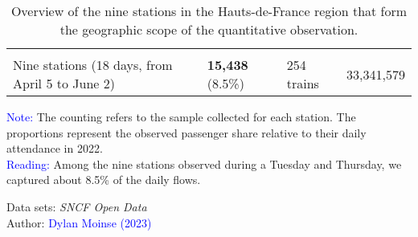 \begin{table}[h!]
{\begin{tabular}{p{}p{}p{}p{}p{}}
      \hdashline
    \multicolumn{5}{l}{\textbf{Complete Sample}}\\
\multicolumn{2}{l}{\small{Nine stations (18 days, from April 5 to June 2)}} & \small{\textbf{15,438} (8.5\%)} & \small{254 trains} & \small{33,341,579}\\
      \hline
    \end{tabular}}
    \caption{Overview of the nine stations in the Hauts-de-France region that form the geographic scope of the quantitative observation.}
    \label{table-chap3:application-observation-quantitative-gares-examinees}
    \vspace{5pt}
        \begin{flushleft}\scriptsize
        \textcolor{blue}{Note:} The counting refers to the sample collected for each station. The proportions represent the observed passenger share relative to their daily attendance in 2022.
        \\
        \textcolor{blue}{Reading:} Among the nine stations observed during a Tuesday and Thursday, we captured about 8.5\% of the daily flows.
        \end{flushleft}
        \begin{flushright}\scriptsize
        Data sets: \textsl{SNCF Open Data} \textcolor{blue}{\autocite{sncf_frequentation_2024}}
        \\
        Author: \textcolor{blue}{Dylan Moinse (2023)}
        \end{flushright}
        \end{table}
